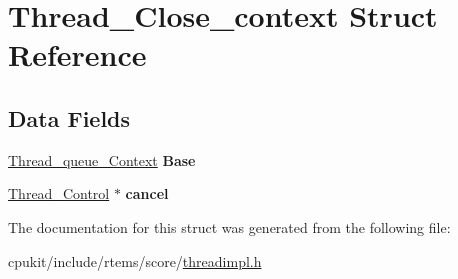 \hypertarget{structThread__Close__context}{}\section{Thread\+\_\+\+Close\+\_\+context Struct Reference}
\label{structThread__Close__context}
\subsection*{Data Fields}
\begin{DoxyCompactItemize}
\item 
\mbox{\label{structThread__Close__context_a2111453b36f609a578bf8daf0d396470}} 
\mbox{\hyperlink{structThread__queue__Context}{Thread\+\_\+queue\+\_\+\+Context}} {\bfseries Base}
\item 
\mbox{\label{structThread__Close__context_ac4bac75091c76e2a203a64f66fa7cb55}} 
\mbox{\hyperlink{struct__Thread__Control}{Thread\+\_\+\+Control}} $\ast$ {\bfseries cancel}
\end{DoxyCompactItemize}


The documentation for this struct was generated from the following file\+:\begin{DoxyCompactItemize}
\item 
cpukit/include/rtems/score/\mbox{\hyperlink{threadimpl_8h}{threadimpl.\+h}}\end{DoxyCompactItemize}
